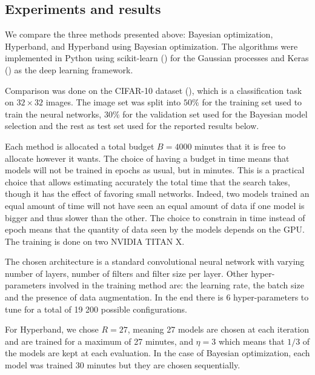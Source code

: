 \subsection{Experiments and results}

We compare the three methods presented above: Bayesian optimization, Hyperband, and Hyperband using Bayesian optimization. The algorithms were implemented in Python using scikit-learn (\textcite{pedregosa2011sklearn}) for the Gaussian processes and Keras (\textcite{chollet2015keras}) as the deep learning framework.

Comparison was done on the CIFAR-10 dataset (\textcite{krizhevsky2009}), which is a classification task on $32 \times 32$ images. The image set was split into $50\%$ for the training set used to train the neural networks, $30\%$ for the validation set used for the Bayesian model selection and the rest as test set used for the reported results below. 

Each method is allocated a total budget $B = 4000$ minutes that it is free to allocate however it wants. The choice of having a budget in time means that models will not be trained in epochs as usual, but in minutes. This is a practical choice that allows estimating accurately the total time that the search takes, though it has the effect of favoring small networks. Indeed, two models trained an equal amount of time will not have seen an equal amount of data if one model is bigger and thus slower than the other. The choice to constrain in time instead of epoch means that the quantity of data seen by the models depends on the GPU. The training is done on two NVIDIA TITAN X.

The chosen architecture is a standard convolutional neural network with varying number of layers, number of filters and filter size per layer. Other hyper-parameters involved in the training method are: the learning rate, the batch size and the presence of data augmentation. In the end there is 6 hyper-parameters to tune for a total of 19 200 possible configurations.

For Hyperband, we chose $R = 27$, meaning 27 models are chosen at each iteration and are trained for a maximum of 27 minutes, and $\eta = 3$ which means that $1/3$ of the models are kept at each evaluation. In the case of Bayesian optimization, each model was trained $30$ minutes but they are chosen sequentially.

